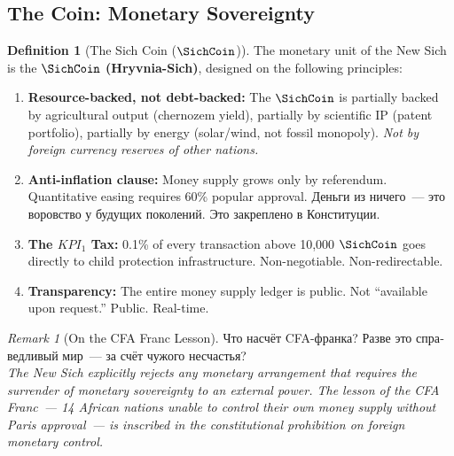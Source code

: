 \documentclass[11pt,a4paper]{article}
\theoremstyle{definition}
\newtheorem{definition}[theorem]{Definition}
\theoremstyle{remark}
\newtheorem{remark}{Remark}
\begin{document}
\subsection{The Coin: Monetary Sovereignty}
\label{sec:sich-coin}

\begin{definition}[The Sich Coin ($\SichCoin$)]
\label{def:sich-coin}
The monetary unit of the New Sich is the
\textbf{$\SichCoin$ (Hryvnia-Sich)}, designed on the following
principles:

\begin{enumerate}[noitemsep, leftmargin=1.5cm]
  \item \textbf{Resource-backed, not debt-backed:}
    The $\SichCoin$ is partially backed by
    agricultural output (chernozem yield),
    partially by scientific IP (patent portfolio),
    partially by energy (solar/wind, not fossil monopoly).
    \textit{Not by foreign currency reserves of other nations.}

  \item \textbf{Anti-inflation clause:}
    Money supply grows only by referendum.
    Quantitative easing requires 60\% popular approval.
    \foreignlanguage{russian}{
    Деньги из ничего~--- это воровство у будущих поколений.
    Это закреплено в Конституции.}

  \item \textbf{The $KPI_1$ Tax:}
    0.1\% of every transaction above 10{,}000 $\SichCoin$
    goes directly to child protection infrastructure.
    Non-negotiable. Non-redirectable.

  \item \textbf{Transparency:}
    The entire money supply ledger is public.
    Not ``available upon request.'' Public. Real-time.
\end{enumerate}
\end{definition}

\begin{remark}[On the CFA Franc Lesson]
\foreignlanguage{russian}{
Что насчёт CFA-франка?
Разве это справедливый мир~--- за счёт чужого несчастья?\\[0.2cm]
}
\textit{The New Sich explicitly rejects any monetary arrangement
that requires the surrender of monetary sovereignty
to an external power.
The lesson of the CFA Franc~--- 14 African nations
unable to control their own money supply without
Paris approval~--- is inscribed in the constitutional
prohibition on foreign monetary control.}
\end{remark}
\end{document}
